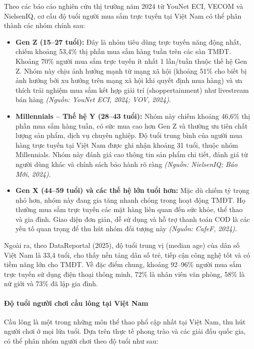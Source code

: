 \documentclass[13pt]{article}
\begin{document}
Theo các báo cáo nghiên cứu thị trường năm 2024 từ YouNet ECI, VECOM và NielsenIQ, cơ cấu độ tuổi người mua sắm trực tuyến tại Việt Nam có thể phân thành các nhóm chính sau:

\begin{itemize}
    \item \textbf{Gen Z (15--27 tuổi):} Đây là nhóm tiêu dùng trực tuyến năng động nhất, chiếm khoảng 53,4\% thị phần mua sắm hàng tuần trên các sàn TMĐT. Khoảng 70\% người mua sắm trực tuyến ít nhất 1 lần/tuần thuộc thế hệ Gen Z. Nhóm này chịu ảnh hưởng mạnh từ mạng xã hội (khoảng 51\% cho biết bị ảnh hưởng bởi xu hướng trên mạng xã hội khi quyết định mua hàng) và ưa thích trải nghiệm mua sắm kết hợp giải trí (shoppertainment) như livestream bán hàng \textit{(Nguồn: YouNet ECI, 2024; VOV, 2024)}.
    
    \item \textbf{Millennials -- Thế hệ Y (28--43 tuổi):} Nhóm này chiếm khoảng 46,6\% thị phần mua sắm hàng tuần, có sức mua cao hơn Gen Z và thường ưu tiên chất lượng sản phẩm, dịch vụ chuyên nghiệp. Độ tuổi trung bình của người mua hàng trực tuyến tại Việt Nam được ghi nhận khoảng 31 tuổi, thuộc nhóm Millennials. Nhóm này đánh giá cao thông tin sản phẩm chi tiết, đánh giá từ người dùng khác và chính sách bảo hành rõ ràng \textit{(Nguồn: NielsenIQ; Báo Mới, 2024)}.
    
    \item \textbf{Gen X (44--59 tuổi) và các thế hệ lớn tuổi hơn:} Mặc dù chiếm tỷ trọng nhỏ hơn, nhóm này đang gia tăng nhanh chóng trong hoạt động TMĐT. Họ thường mua sắm trực tuyến các mặt hàng liên quan đến sức khỏe, thể thao và gia đình. Giao diện đơn giản, dễ sử dụng và hỗ trợ thanh toán COD là các yếu tố quan trọng để thu hút nhóm đối tượng này \textit{(Nguồn: CafeF, 2024)}.
\end{itemize}

Ngoài ra, theo DataReportal (2025), độ tuổi trung vị (median age) của dân số Việt Nam là 33,4 tuổi, cho thấy nền tảng dân số trẻ, tiếp cận công nghệ tốt và có tiềm năng lớn cho TMĐT. Về đặc điểm chung, khoảng 92--96\% người mua sắm trực tuyến sử dụng điện thoại thông minh, 72\% là nhân viên văn phòng, 58\% là nữ giới và 73\% đã lập gia đình.

\paragraph{Độ tuổi người chơi cầu lông tại Việt Nam}

Cầu lông là một trong những môn thể thao phổ cập nhất tại Việt Nam, thu hút người chơi ở mọi lứa tuổi. Dựa trên thực tế phong trào và các giải đấu quốc gia, có thể phân nhóm người chơi theo độ tuổi như sau:
\end{document}
